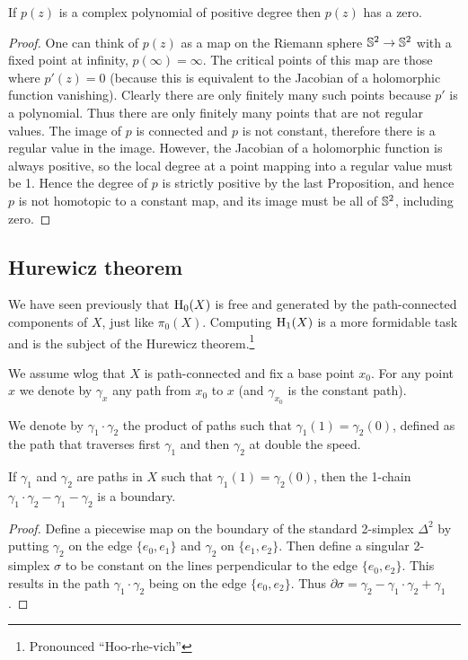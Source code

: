 \begin{cor}
    If $p(z)$ is a complex polynomial of positive degree then $p(z)$ has a zero.
\end{cor}
\begin{proof}
     One can think of $p(z)$ as a map on the Riemann sphere $\mathbb{S}^2\to \mathbb{S}^2$ with a fixed point at infinity, $p(\infty)=\infty$. The critical points of this map are those where $p'(z)=0$ (because this is equivalent to the Jacobian of a holomorphic function vanishing). Clearly there are only finitely many such points because $p'$ is a polynomial. Thus there are only finitely many points that are not regular values. The image of $p$ is connected and $p$ is not constant, therefore there is a regular value in the image. However, the Jacobian of a holomorphic function is always positive, so the local degree at a point mapping into a regular value must be 1. Hence the degree of $p$ is strictly positive by the last Proposition, and hence $p$ is not homotopic to a constant map, and its image must be all of $\mathbb{S}^2$, including zero.
\end{proof}



\subsection{Hurewicz theorem}

We have seen previously that $\mathrm{H}_0(X)$ is free and generated by the path-connected components of $X$, just like $\pi_0(X)$. Computing $\mathrm{H}_1(X)$ is a more formidable task and is the subject of the Hurewicz theorem.\footnote{Pronounced ``Hoo-rhe-vich''}

We assume \gls{wlog} that $X$ is path-connected and fix a base point $x_0$. For any point $x$ we denote by $\gamma_x$ any path from $x_0$ to $x$ (and $\gamma_{x_0}$ is the constant path).

We denote by $\gamma_1\cdot \gamma_2$ the product of paths such that $\gamma_1(1)=\gamma_2(0)$, defined as the path that traverses first $\gamma_1$ and then $\gamma_2$ at double the speed.

\begin{lem}
    If $\gamma_1$ and $\gamma_2$ are paths in $X$ such that $\gamma_1(1)=\gamma_2(0)$, then the 1-chain $\gamma_1\cdot\gamma_2-\gamma_1-\gamma_2$ is a boundary.
\end{lem}
\begin{proof}
     Define a piecewise map on the boundary of the standard 2-simplex $\Delta^2$ by putting $\gamma_2$ on the edge $\{e_0,e_1\}$ and $\gamma_2$ on $\{e_1,e_2\}$. Then define a singular 2-simplex $\sigma$ to be constant on the lines perpendicular to the edge $\{e_0,e_2\}$. This results in the path $\gamma_1\cdot\gamma_2$ being on the edge $\{e_0,e_2\}$. Thus $\partial\sigma=\gamma_2-\gamma_1\cdot\gamma_2+\gamma_1$.
\end{proof}

